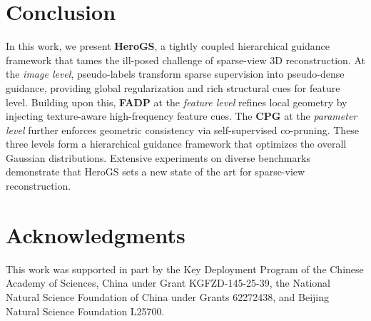 \section{Conclusion}
In this work, we present \textbf{HeroGS}, a tightly coupled hierarchical guidance framework that tames the ill-posed challenge of sparse-view 3D reconstruction.
At the \textit{image level}, pseudo-labels transform sparse supervision into pseudo-dense guidance, providing global regularization and rich structural cues for feature level.
Building upon this, \textbf{FADP} at the \textit{feature level} refines local geometry by injecting texture-aware high-frequency feature cues.
The \textbf{CPG} at the \textit{parameter level} further enforces geometric consistency via self-supervised co-pruning. These three levels form a hierarchical guidance framework that optimizes the overall Gaussian distributions.
Extensive experiments on diverse benchmarks demonstrate that HeroGS sets a new state of the art for sparse-view reconstruction.
\section*{Acknowledgments}
This work was supported in part by the Key Deployment Program of the Chinese Academy of Sciences, China under Grant KGFZD-145-25-39, the National Natural Science
Foundation of China under Grants 62272438, and Beijing
Natural Science Foundation L25700.

